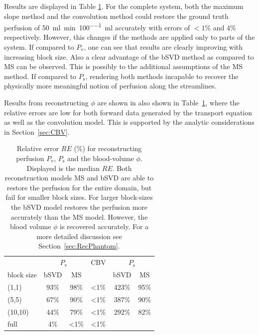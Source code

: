 \documentclass[journal,twocolumn]{IEEEtran}
\newcommand{\Perfv}{P_{\mathrm{v}}}
\newcommand{\Perfs}{P_{\mathrm{s}}}
\newcommand{\siPml}{\milli\litre\per\minute\per100\milli\litre}
\begin{document}
	Results are displayed in Table \ref{tab:resultsSim}. 
	For the complete system, both the maximum slope method and the convolution method could restore the ground truth perfusion of \SI{50}{\siPml} accurately with errors of $<1\%$ and $4\%$ respectively.
	However, this changes if the methods are applied only to parts of the system.
	If compared to $\Perfv$, one can see that results are clearly improving with increasing block size.
	Also a clear advantage of the bSVD method as compared to MS can be observed.
	This is possibly to the additional assumptions of the MS method.
	If compared to $\Perfs$, rendering both methods incapable to recover the physically more meaningful notion of perfusion along the streamlines.
		
	Results from reconstructing $\phi$ are shown in also shown in Table~\ref{tab:resultsSim}, where the relative errors are low for both forward data generated by the transport equation as well as the convolution model.
	This is supported by the analytic considerations in Section~\ref{sec:CBV}.
	
	\begin{table}[h!tb]
		\scriptsize
		\caption{Relative error $RE$ (\%) for reconstructing perfusion $\Perfv$, $\Perfs$ and the blood-volume $\phi$. Displayed is the median $RE$. Both reconstruction models MS and bSVD are able to restore the perfusion for the entire domain, but fail for smaller block sizes. For larger block-sizes the bSVD model restores the perfusion more accurately than the MS model. However, the blood volume $\phi$ is recovered accurately. For a more detailed discussion see Section~\ref{sec:RecPhantom}.}
		\centering
		\begin{tabular}{p{1cm} c c c c c}
						& \multicolumn{2}{c}{$\Perfv$} & CBV & \multicolumn{2}{c}{$\Perfs$}  \\
			block size	& bSVD	& MS 	&  		& bSVD	& MS 	\\ \toprule
			(1,1) 		& 93\%	& 98\%  & <1\%  & 423\%	& 95\% 	\\
			(5,5) 		& 67\%	& 90\% 	& <1\% 	& 387\%	& 90\% 	\\
			(10,10) 	& 44\%	& 79\% 	& <1\% 	& 292\%	& 82\% 	\\
			full    	& 4\%	& <1\%  & <1\%	& 		& 	   
		\end{tabular}
		\label{tab:resultsSim}
	\end{table}
\end{document}

